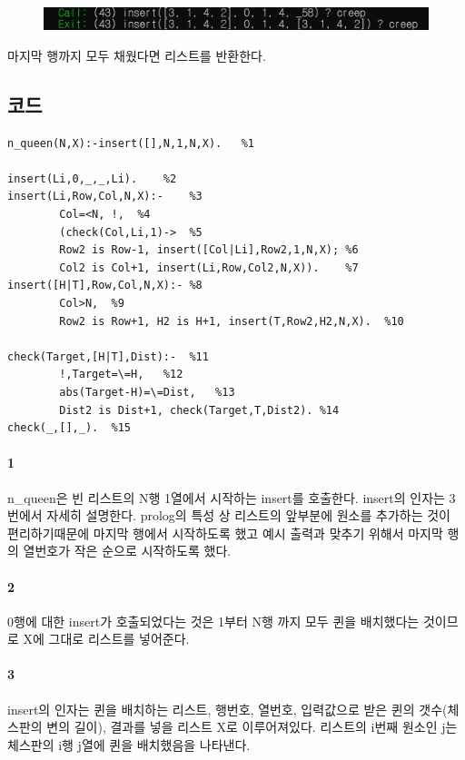 \documentclass{oblivoir}
\begin{document}
\begin{figure}[H]
  
    \includegraphics[width=0.5\linewidth]{trace_b6.PNG}
   
\end{figure}
마지막 행까지 모두 채웠다면 리스트를 반환한다.

\subsection{코드}
\begin{verbatim}
n_queen(N,X):-insert([],N,1,N,X).   %1

insert(Li,0,_,_,Li).    %2
insert(Li,Row,Col,N,X):-    %3
        Col=<N, !,  %4
        (check(Col,Li,1)->  %5
        Row2 is Row-1, insert([Col|Li],Row2,1,N,X); %6
        Col2 is Col+1, insert(Li,Row,Col2,N,X)).    %7
insert([H|T],Row,Col,N,X):- %8
        Col>N,  %9
        Row2 is Row+1, H2 is H+1, insert(T,Row2,H2,N,X).  %10

check(Target,[H|T],Dist):-  %11
        !,Target=\=H,   %12
        abs(Target-H)=\=Dist,   %13
        Dist2 is Dist+1, check(Target,T,Dist2). %14
check(_,[],_).  %15
\end{verbatim}

\paragraph*{1}
n\_queen은 빈 리스트의 N행 1열에서 시작하는 insert를 호출한다. insert의 인자는 3번에서 자세히 설명한다. prolog의 특성 상 리스트의 앞부분에 원소를 추가하는 것이 편리하기때문에 마지막 행에서 시작하도록 했고 예시 출력과 맞추기 위해서 마지막 행의 열번호가 작은 순으로 시작하도록 했다.

\paragraph*{2}
0행에 대한 insert가 호출되었다는 것은 1부터 N행 까지 모두 퀸을 배치했다는 것이므로 X에 그대로 리스트를 넣어준다.

\paragraph*{3}
insert의 인자는 퀸을 배치하는 리스트, 행번호, 열번호, 입력값으로 받은 퀸의 갯수(체스판의 변의 길이), 결과를 넣을 리스트 X로 이루어져있다. 리스트의 i번째 원소인 j는 체스판의 i행 j열에 퀸을 배치했음을 나타낸다.
\end{document}
